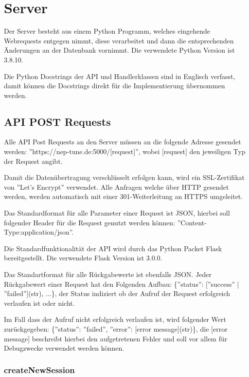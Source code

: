 \documentclass[oneside, ngerman]{sdqtechreport}
\begin{document}
\chapter{Server}
\label{chap:Server}



Der Server besteht aus einem Python Programm, welches eingehende Webrequests entgegen nimmt, diese verarbeitet und dann die entsprechenden Änderungen an der Datenbank vornimmt. Die verwendete Python Version ist 3.8.10.

Die Python Docstrings der API und Handlerklassen sind in Englisch verfasst, damit können die Docstrings direkt für die Implementierung übernommen werden.

\section{API POST Requests}

Alle API Post Requests an den Server müssen an die folgende Adresse gesendet werden: ''https://nep-tune.de:5000/[request]'', wobei [request] den jeweiligen Typ der Request angibt.

Damit die Datenübertragung verschlüsselt erfolgen kann, wird ein SSL-Zertifikat von ''Let's Encrypt'' verwendet. Alle Anfragen welche über HTTP gesendet werden, werden automatisch mit einer 301-Weiterleitung an HTTPS umgeleitet.

Das Standardformat für alle Parameter einer Request ist JSON, hierbei soll folgender Header für die Request genutzt werden können: ''Content-Type:application/json''.

Die Standardfunktionalität der API wird durch das Python Packet Flask bereitgestellt. Die verwendete Flask Version ist 3.0.0.

Das Standartformat für alle Rückgabewerte ist ebenfalls JSON.
Jeder Rückgabewert einer Request hat den Folgenden Aufbau: \{''status'': [''success'' | ''failed''](str), ...\}, der Status indiziert ob der Aufruf der Request erfolgreich verlaufen ist oder nicht.

Im Fall dass der Aufruf nicht erfolgreich verlaufen ist, wird folgender Wert zurückgegeben: \{''status'': ''failed'', ''error'': [error message](str)\}, die [error message] beschreibt hierbei den aufgetretenen Fehler und soll vor allem für Debugzwecke verwendet werden können.


\subsection*{createNewSession}
\end{document}
